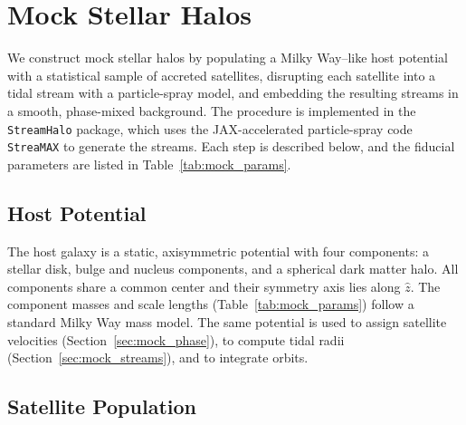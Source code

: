 
\section{Mock Stellar Halos} \label{sec:mock}

We construct mock stellar halos by populating a Milky Way--like host potential with a
statistical sample of accreted satellites, disrupting each satellite into a tidal stream with
a particle-spray model, and embedding the resulting streams in a smooth, phase-mixed
background. The procedure is implemented in the \texttt{StreamHalo} package, which uses
the JAX-accelerated particle-spray code \texttt{StreaMAX} to generate the streams. Each step
is described below, and the fiducial parameters are listed in Table~\ref{tab:mock_params}.

\subsection{Host Potential} \label{sec:mock_host}

The host galaxy is a static, axisymmetric potential with four components: a
\citet{Miyamoto1975} stellar disk, \citet{Hernquist1990} bulge and nucleus components, and a
spherical \citet*[NFW;][]{Navarro1997} dark matter halo. All components share a common center
and their symmetry axis lies along $\hat{z}$. The component masses and scale lengths
(Table~\ref{tab:mock_params}) follow a standard Milky Way mass model. The same potential is
used to assign satellite velocities (Section~\ref{sec:mock_phase}), to compute tidal radii
(Section~\ref{sec:mock_streams}), and to integrate orbits.

\subsection{Satellite Population} \label{sec:mock_sats}

